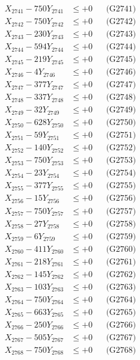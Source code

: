 \documentclass[a4paper,10pt]{article}
\begin{document}
{\begin{align}
\allowbreak
X_{2741} - 750Y_{2741} &\leq +0 && \text{(G2741)} \\
X_{2742} - 750Y_{2742} &\leq +0 && \text{(G2742)} \\
X_{2743} - 230Y_{2743} &\leq +0 && \text{(G2743)} \\
X_{2744} - 594Y_{2744} &\leq +0 && \text{(G2744)} \\
X_{2745} - 219Y_{2745} &\leq +0 && \text{(G2745)} \\
X_{2746} - 4Y_{2746} &\leq +0 && \text{(G2746)} \\
X_{2747} - 377Y_{2747} &\leq +0 && \text{(G2747)} \\
X_{2748} - 337Y_{2748} &\leq +0 && \text{(G2748)} \\
X_{2749} - 32Y_{2749} &\leq +0 && \text{(G2749)} \\
X_{2750} - 628Y_{2750} &\leq +0 && \text{(G2750)} \\
\allowbreak
X_{2751} - 59Y_{2751} &\leq +0 && \text{(G2751)} \\
X_{2752} - 140Y_{2752} &\leq +0 && \text{(G2752)} \\
X_{2753} - 750Y_{2753} &\leq +0 && \text{(G2753)} \\
X_{2754} - 23Y_{2754} &\leq +0 && \text{(G2754)} \\
X_{2755} - 377Y_{2755} &\leq +0 && \text{(G2755)} \\
X_{2756} - 15Y_{2756} &\leq +0 && \text{(G2756)} \\
X_{2757} - 750Y_{2757} &\leq +0 && \text{(G2757)} \\
X_{2758} - 27Y_{2758} &\leq +0 && \text{(G2758)} \\
X_{2759} - 6Y_{2759} &\leq +0 && \text{(G2759)} \\
X_{2760} - 411Y_{2760} &\leq +0 && \text{(G2760)} \\
\allowbreak
X_{2761} - 218Y_{2761} &\leq +0 && \text{(G2761)} \\
X_{2762} - 145Y_{2762} &\leq +0 && \text{(G2762)} \\
X_{2763} - 103Y_{2763} &\leq +0 && \text{(G2763)} \\
X_{2764} - 750Y_{2764} &\leq +0 && \text{(G2764)} \\
X_{2765} - 663Y_{2765} &\leq +0 && \text{(G2765)} \\
X_{2766} - 250Y_{2766} &\leq +0 && \text{(G2766)} \\
X_{2767} - 505Y_{2767} &\leq +0 && \text{(G2767)} \\
X_{2768} - 750Y_{2768} &\leq +0 && \text{(G2768)} \\

\end{align}}
\end{document}
